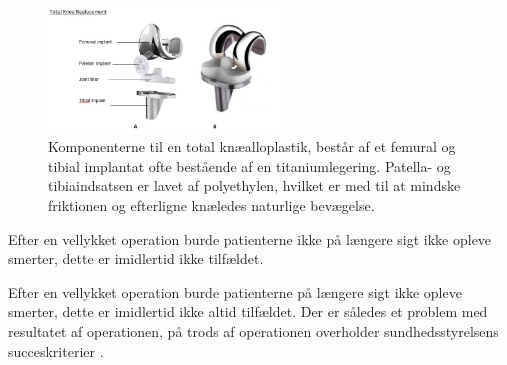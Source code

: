 \begin{figure}[H] 
	\begin{center}
		\includegraphics[width=0.55\textwidth]{../figures/tka_implant}
	\end{center}
	\caption{Komponenterne til en total knæalloplastik, består af et femural og tibial implantat ofte bestående af en titaniumlegering. Patella- og tibiaindsatsen er lavet af polyethylen, hvilket er med til at mindske friktionen og efterligne knæledes naturlige bevægelse. \citep{Robodoc2016}} 
	\label{fig:tka_implant} 
\end{figure} \vspace{-.50cm}

Efter en vellykket operation burde patienterne ikke på længere sigt ikke opleve smerter, dette er imidlertid ikke tilfældet.

Efter en vellykket operation burde patienterne på længere sigt ikke opleve smerter, dette er imidlertid ikke altid tilfældet. Der er således et problem med resultatet af operationen, på trods af operationen overholder sundhedsstyrelsens succeskriterier \citep{aarsrapport2016}. 

